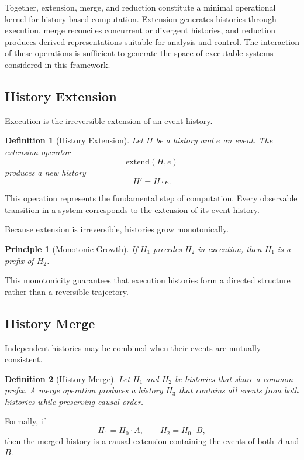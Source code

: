 \documentclass[12pt]{article}
\newtheorem{definition}{Definition}
\newtheorem{principle}{Principle}
\begin{document}
Together, extension, merge, and reduction constitute a
minimal operational kernel for history-based computation.
Extension generates histories through execution, merge
reconciles concurrent or divergent histories, and
reduction produces derived representations suitable
for analysis and control. The interaction of these
operations is sufficient to generate the space of
executable systems considered in this framework.

\subsection{History Extension}

Execution is the irreversible extension of an event history.

\begin{definition}[History Extension]
Let $H$ be a history and $e$ an event. The extension operator
\[
\mathrm{extend}(H,e)
\]
produces a new history
\[
H' = H \cdot e.
\]
\end{definition}

This operation represents the fundamental step of computation.
Every observable transition in a system corresponds to the
extension of its event history.

Because extension is irreversible, histories grow monotonically.

\begin{principle}[Monotonic Growth]
If $H_1$ precedes $H_2$ in execution, then $H_1$ is a prefix
of $H_2$.
\end{principle}

This monotonicity guarantees that execution histories
form a directed structure rather than a reversible trajectory.

\subsection{History Merge}

Independent histories may be combined when their events
are mutually consistent.

\begin{definition}[History Merge]
Let $H_1$ and $H_2$ be histories that share a common prefix.
A merge operation produces a history $H_3$ that contains
all events from both histories while preserving causal order.
\end{definition}

Formally, if
\[
H_1 = H_0 \cdot A,
\qquad
H_2 = H_0 \cdot B,
\]
then the merged history is a causal extension containing
the events of both $A$ and $B$.
\end{document}
